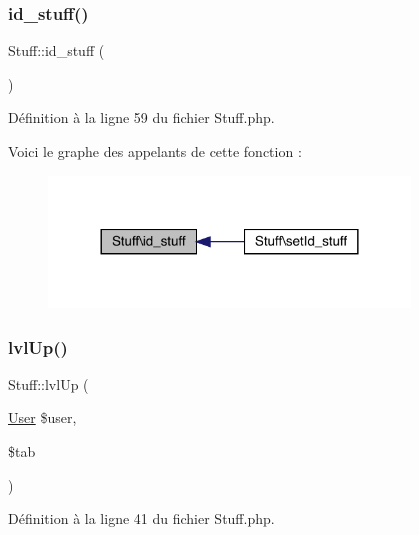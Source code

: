 \subsubsection{\texorpdfstring{id\+\_\+stuff()}{id\_stuff()}}
{\footnotesize\ttfamily Stuff\+::id\+\_\+stuff (\begin{DoxyParamCaption}{ }\end{DoxyParamCaption})}



Définition à la ligne 59 du fichier Stuff.\+php.

Voici le graphe des appelants de cette fonction \+:\nopagebreak
\begin{figure}[H]
\begin{center}
\leavevmode
\includegraphics[width=272pt]{class_stuff_afa98c482eb21f0fa990545bdb0b66dba_icgraph}
\end{center}
\end{figure}
\mbox{\label{class_stuff_a58df203bb30ef856eab931a8b363ee69}} 
\subsubsection{\texorpdfstring{lvl\+Up()}{lvlUp()}}
{\footnotesize\ttfamily Stuff\+::lvl\+Up (\begin{DoxyParamCaption}\item[{\mbox{\hyperlink{class_user}{User}}}]{\$user,  }\item[{}]{\$tab }\end{DoxyParamCaption})}



Définition à la ligne 41 du fichier Stuff.\+php.

